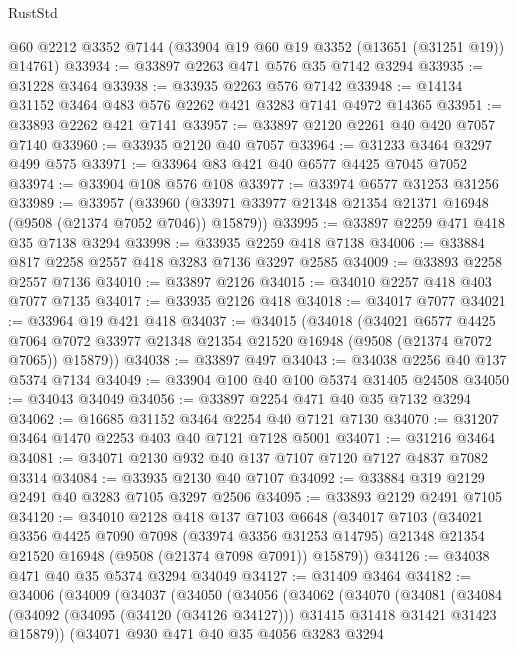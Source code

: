 \begin{lexlean}{RustStd}
\begin{coremodule}
    @60
    @2212
    @3352
    @7144
    (@33904 @19 @60 @19 @3352 (@13651 (@31251 @19)) @14761)
@33934 := @33897 @2263 @471 @576 @35 @7142 @3294
@33935 := @31228 @3464
@33938 := @33935 @2263 @576 @7142
@33948 := @14134 @31152 @3464 @483 @576 @2262 @421 @3283 @7141 @4972 @14365
@33951 := @33893 @2262 @421 @7141
@33957 := @33897 @2120 @2261 @40 @420 @7057 @7140
@33960 := @33935 @2120 @40 @7057
@33964 := @31233 @3464 @3297 @499 @575
@33971 := @33964 @83 @421 @40 @6577 @4425 @7045 @7052
@33974 := @33904 @108 @576 @108
@33977 := @33974 @6577 @31253 @31256
@33989 := @33957
    (@33960 (@33971 @33977 @21348 @21354 @21371 @16948 (@9508 (@21374 @7052 @7046)) @15879))
@33995 := @33897 @2259 @471 @418 @35 @7138 @3294
@33998 := @33935 @2259 @418 @7138
@34006 := @33884 @817 @2258 @2557 @418 @3283 @7136 @3297 @2585
@34009 := @33893 @2258 @2557 @7136
@34010 := @33897 @2126
@34015 := @34010 @2257 @418 @403 @7077 @7135
@34017 := @33935 @2126 @418
@34018 := @34017 @7077
@34021 := @33964 @19 @421 @418
@34037 := @34015
    (@34018
      (@34021
        @6577
        @4425
        @7064
        @7072
        @33977
        @21348
        @21354
        @21520
        @16948
        (@9508 (@21374 @7072 @7065))
        @15879))
@34038 := @33897 @497
@34043 := @34038 @2256 @40 @137 @5374 @7134
@34049 := @33904 @100 @40 @100 @5374 @31405 @24508
@34050 := @34043 @34049
@34056 := @33897 @2254 @471 @40 @35 @7132 @3294
@34062 := @16685 @31152 @3464 @2254 @40 @7121 @7130
@34070 := @31207 @3464 @1470 @2253 @403 @40 @7121 @7128 @5001
@34071 := @31216 @3464
@34081 := @34071 @2130 @932 @40 @137 @7107 @7120 @7127 @4837 @7082 @3314
@34084 := @33935 @2130 @40 @7107
@34092 := @33884 @319 @2129 @2491 @40 @3283 @7105 @3297 @2506
@34095 := @33893 @2129 @2491 @7105
@34120 := @34010
    @2128
    @418
    @137
    @7103
    @6648
    (@34017
      @7103
      (@34021
        @3356
        @4425
        @7090
        @7098
        (@33974 @3356 @31253 @14795)
        @21348
        @21354
        @21520
        @16948
        (@9508 (@21374 @7098 @7091))
        @15879))
@34126 := @34038 @471 @40 @35 @5374 @3294 @34049
@34127 := @31409 @3464
@34182 := @34006
    (@34009
      (@34037
        (@34050
          (@34056
            (@34062
              (@34070
                (@34081
                  (@34084
                    (@34092 (@34095 (@34120 (@34126 @34127))) @31415 @31418 @31421 @31423 @15879))
                  (@34071
                    @930
                    @471
                    @40
                    @35
                    @4056
                    @3283
                    @3294

\end{coremodule}
\end{lexlean}
